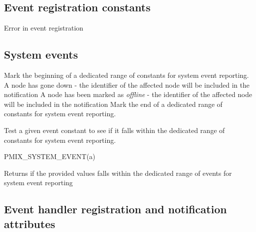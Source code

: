 \subsection{Event registration constants}
\label{api:struct:constants:event}

\begin{constantdesc}

%
Error in event registration

\end{constantdesc}

\subsection{System events}
\label{api:struct:sys:event}

\begin{constantdesc}
%
Mark the beginning of a dedicated range of constants for system event reporting.
%
A node has gone down - the identifier of the affected node will be included in the notification
%
A node has been marked as \emph{offline} - the identifier of the affected node will be included in the notification
%
Mark the end of a dedicated range of constants for system event reporting.

\end{constantdesc}


Test a given event constant to see if it falls within the dedicated range of constants for system event reporting.

\cspecificstart
\begin{codepar}
PMIX_SYSTEM_EVENT(a)
\end{codepar}
\cspecificend

\begin{arglist}
\end{arglist}

Returns  if the provided values falls within the dedicated range of events for system event reporting

\subsection{Event handler registration and notification attributes}
\label{api:struct:attributes:event}

